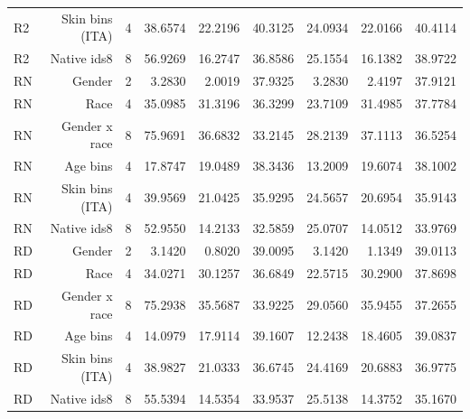 \documentclass[10pt]{article}
\begin{document}
\begin{longtable}{@{}lrrrrrrrr@{}}
R2 & Skin bins (ITA) & 4 & 38.6574 & 22.2196 & 40.3125 & 24.0934 & 22.0166 & 40.4114 \\
R2 & Native ids8 & 8 & 56.9269 & 16.2747 & 36.8586 & 25.1554 & 16.1382 & 38.9722 \\
RN & Gender & 2 & 3.2830 & 2.0019 & 37.9325 & 3.2830 & 2.4197 & 37.9121 \\
RN & Race & 4 & 35.0985 & 31.3196 & 36.3299 & 23.7109 & 31.4985 & 37.7784 \\
RN & Gender x race & 8 & 75.9691 & 36.6832 & 33.2145 & 28.2139 & 37.1113 & 36.5254 \\
RN & Age bins & 4 & 17.8747 & 19.0489 & 38.3436 & 13.2009 & 19.6074 & 38.1002 \\
RN & Skin bins (ITA) & 4 & 39.9569 & 21.0425 & 35.9295 & 24.5657 & 20.6954 & 35.9143 \\
RN & Native ids8 & 8 & 52.9550 & 14.2133 & 32.5859 & 25.0707 & 14.0512 & 33.9769 \\
RD & Gender & 2 & 3.1420 & 0.8020 & 39.0095 & 3.1420 & 1.1349 & 39.0113 \\
RD & Race & 4 & 34.0271 & 30.1257 & 36.6849 & 22.5715 & 30.2900 & 37.8698 \\
RD & Gender x race & 8 & 75.2938 & 35.5687 & 33.9225 & 29.0560 & 35.9455 & 37.2655 \\
RD & Age bins & 4 & 14.0979 & 17.9114 & 39.1607 & 12.2438 & 18.4605 & 39.0837 \\
RD & Skin bins (ITA) & 4 & 38.9827 & 21.0333 & 36.6745 & 24.4169 & 20.6883 & 36.9775 \\
RD & Native ids8 & 8 & 55.5394 & 14.5354 & 33.9537 & 25.5138 & 14.3752 & 35.1670 \\
\end{longtable}
\end{document}
